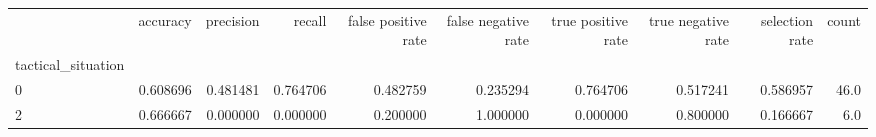 \begin{tabular}{lrrrrrrrrr}
\toprule
{} &  accuracy &  precision &    recall &  false positive rate &  false negative rate &  true positive rate &  true negative rate &  selection rate &  count \\
tactical\_situation &           &            &           &                      &                      &                     &                     &                 &        \\
\midrule
0                  &  0.608696 &   0.481481 &  0.764706 &             0.482759 &             0.235294 &            0.764706 &            0.517241 &        0.586957 &   46.0 \\
2                  &  0.666667 &   0.000000 &  0.000000 &             0.200000 &             1.000000 &            0.000000 &            0.800000 &        0.166667 &    6.0 \\
\bottomrule
\end{tabular}
